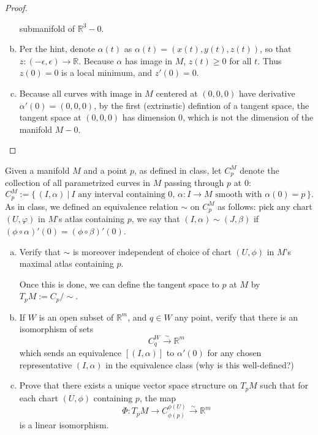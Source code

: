 \documentclass{article}
\newenvironment{problem}[2][Problem]{\begin{trivlist}
\item[\hskip \labelsep {\bfseries #1}\hskip \labelsep {\bfseries #2.}]}{\end{trivlist}}
\begin{document}
\begin{proof}
\begin{enumerate}[(a)]
      submanifold of $\mathbb{R}^3 - 0$.
    \item %
      Per the hint, denote $\alpha(t)$ as $\alpha(t) = (x(t),y(t),z(t))$, so
      that $z\colon (-\epsilon,\epsilon) \rightarrow \mathbb{R}$.
      Because $\alpha$ has image in $M$, $z(t) \geq 0$ for all $t$.
      Thus $z(0) = 0$ is a local minimum, and $z'(0) = 0$.
    \item
      Because all curves with image in $M$ centered at $(0,0,0)$ have derivative
      $\alpha'(0) = (0,0,0)$, by the first (extrinstic) defintion of a tangent
      space, the tangent space at $(0,0,0)$ has dimension $0$, which is not the
      dimension of the manifold $M - 0$.
  \end{enumerate}
\end{proof}

\pagebreak

\begin{problem}{3}
  Given a manifold $M$ and a point $p$, as defined in class, let $C^M_p$
  denote the collection of all parametrized curves in $M$ passing through $p$ at
  $0$: \[
    C_p^M := \{\,
      (I, \alpha)\ |\
      I\text{ any interval containing 0, }
      \alpha\colon I \rightarrow M \text{ smooth with } \alpha(0) = p\,
    \}.
  \]
  As in class, we defined an equivalence relation $\sim$ on $C_p^M$ as follows:
  pick any chart $(U, \varphi)$ in $M$'s atlas containing $p$, we say that
  $(I, \alpha) \sim (J, \beta)$ if
  $(\phi \circ \alpha)'(0) = (\phi \circ \beta)'(0)$.
  \begin{enumerate}[(a)]
    \item Verify that $\sim$ is moreover independent of choice of chart
    $(U, \phi)$ in $M$’s maximal atlas containing $p$.

    Once this is done, we can define the tangent space to $p$ at $M$ by $T_pM := C_p/\sim$.
    \item
      If $W$ is an open subset of $\mathbb{R}^m$, and $q \in W$ any point,
      verify that there is an isomorphism of sets \[
        C_q^W \xrightarrow{\sim} \mathbb{R}^m
      \]
      which sends an equivalence $[(I, \alpha)]$ to $\alpha'(0)$ for any chosen
      representative $(I, \alpha)$ in the equivalence class (why is this
      well-defined?)
    \item
      Prove that there exists a unique vector space structure on $T_pM$ such that
      for each chart $(U, \phi)$ containing $p$, the map \[
        \Phi\colon T_pM
        \rightarrow C_{\phi(p)}^{\phi(U)}
        \xrightarrow{\sim} \mathbb{R}^m
      \] is a linear isomorphism.
  \end{enumerate}
\end{problem}
\end{document}
